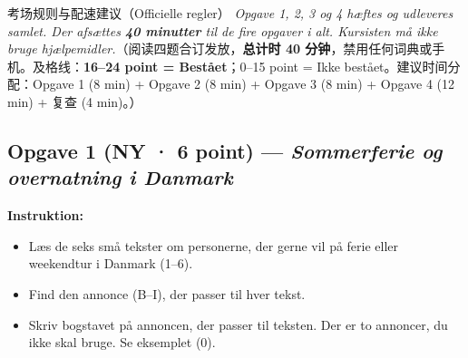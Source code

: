 

\begin{tipbox}{考场规则与配速建议（Officielle regler）}
\small
\textit{Opgave 1, 2, 3 og 4 hæftes og udleveres samlet. Der afsættes \textbf{40 minutter} til de fire opgaver i alt. Kursisten må ikke bruge hjælpemidler.}（阅读四题合订发放，\textbf{总计时 40 分钟}，禁用任何词典或手机。及格线：\textbf{16--24 point = Bestået}；0--15 point = Ikke bestået。建议时间分配：Opgave 1 (8 min) + Opgave 2 (8 min) + Opgave 3 (8 min) + Opgave 4 (12 min) + 复查 (4 min)。）
\end{tipbox}

\subsection*{Opgave 1 (NY · 6 point) --- \textit{Sommerferie og overnatning i Danmark}}

\textbf{Instruktion:}
\begin{itemize}
  \item Læs de seks små tekster om personerne, der gerne vil på ferie eller weekendtur i Danmark (1--6).
  \item Find den annonce (B--I), der passer til hver tekst.
  \item Skriv bogstavet på annoncen, der passer til teksten. Der er to annoncer, du ikke skal bruge. Se eksemplet (0).
\end{itemize}

